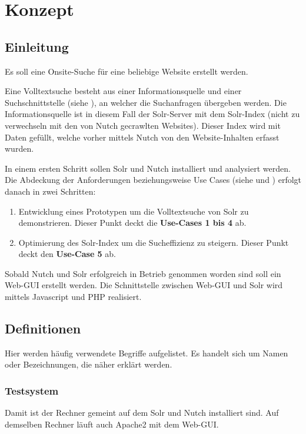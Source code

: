 \cleardoublepage\chapter{Konzept}\label{chap:Konzept}
\section{Einleitung}
Es soll eine Onsite-Suche für eine beliebige Website erstellt werden.

Eine Volltextsuche besteht aus einer Informationsquelle und einer Suchschnittstelle (siehe ), an welcher die Suchanfragen übergeben werden. Die Informationsquelle ist in diesem Fall der Solr-Server mit dem Solr-Index (nicht zu verwechseln mit den von Nutch gecrawlten Websites). Dieser Index wird mit Daten gefüllt, welche vorher mittels Nutch von den Website-Inhalten erfasst wurden.

In einem ersten Schritt sollen Solr und Nutch installiert und analysiert werden. Die Abdeckung der Anforderungen beziehungsweise Use Cases (siehe  und ) erfolgt danach in zwei Schritten:
\begin{enumerate}
\item Entwicklung eines Prototypen um die Volltextsuche von Solr zu demonstrieren. Dieser Punkt deckt die \textbf{Use-Cases 1 bis 4} ab.
\item Optimierung des Solr-Index um die Sucheffizienz zu steigern. Dieser Punkt deckt den \textbf{Use-Case 5} ab.
\end{enumerate}

Sobald Nutch und Solr erfolgreich in Betrieb genommen worden sind soll ein Web-GUI erstellt werden. Die Schnittstelle zwischen Web-GUI und Solr wird mittels Javascript und PHP realisiert.

\section{Definitionen}
Hier werden häufig verwendete Begriffe aufgelistet. Es handelt sich um Namen oder Bezeichnungen, die näher erklärt werden.

\subsection*{Testsystem}
Damit ist der Rechner gemeint auf dem Solr und Nutch installiert sind. Auf demselben Rechner läuft auch Apache2 mit dem Web-GUI.

